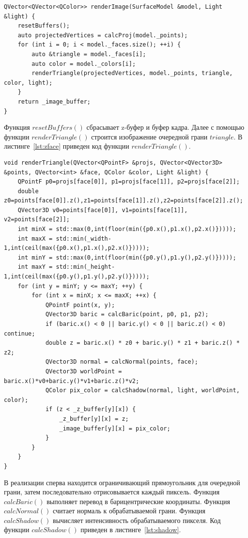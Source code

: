 \documentclass[a4paper, 14pt]{extreport}
\begin{document}
\begin{lstlisting}[style=lang, label=lst:z,caption=Реализация функции renderImage]
QVector<QVector<QColor>> renderImage(SurfaceModel &model, Light &light) {
    resetBuffers();
    auto projectedVertices = calcProj(model._points);
    for (int i = 0; i < model._faces.size(); ++i) {
        auto &triangle = model._faces[i];
        auto color = model._colors[i];
        renderTriangle(projectedVertices, model._points, triangle, color, light);
    }
    return _image_buffer;
}
\end{lstlisting}

Функция $resetBuffers()$ сбрасывает z-буфер и буфер кадра. Далее с помощью функции $renderTriangle()$ строится изображение
очередной грани $triangle$. В листинге~\ref{lst:zface} приведен код функции $renderTriangle()$.

\begin{lstlisting}[style=lang, label=lst:zface,caption=Реализация функции renderTriangle]
void renderTriangle(QVector<QPointF> &projs, QVector<QVector3D> &points, QVector<int> &face, QColor &color, Light &light) {
    QPointF p0=projs[face[0]], p1=projs[face[1]], p2=projs[face[2]];
    double z0=points[face[0]].z(),z1=points[face[1]].z(),z2=points[face[2]].z();
    QVector3D v0=points[face[0]], v1=points[face[1]], v2=points[face[2]];
    int minX = std::max(0,int(floor(min({p0.x(),p1.x(),p2.x()}))));
    int maxX = std::min(_width-1,int(ceil(max({p0.x(),p1.x(),p2.x()}))));
    int minY = std::max(0,int(floor(min({p0.y(),p1.y(),p2.y()}))));
    int maxY = std::min(_height-1,int(ceil(max({p0.y(),p1.y(),p2.y()}))));
    for (int y = minY; y <= maxY; ++y) {
        for (int x = minX; x <= maxX; ++x) {
            QPointF point(x, y);
            QVector3D baric = calcBaric(point, p0, p1, p2);
            if (baric.x() < 0 || baric.y() < 0 || baric.z() < 0) continue;
            double z = baric.x() * z0 + baric.y() * z1 + baric.z() * z2;
            QVector3D normal = calcNormal(points, face);
            QVector3D worldPoint = baric.x()*v0+baric.y()*v1+baric.z()*v2;
            QColor pix_color = calcShadow(normal, light, worldPoint, color);
            if (z < _z_buffer[y][x]) {
                _z_buffer[y][x] = z;
                _image_buffer[y][x] = pix_color;
            }
        }
    }
}
\end{lstlisting}

В реализации сперва находится ограничивающий прямоугольник для очередной грани, затем последовательно отрисовывается
каждый пиксель. Функция $calcBaric()$ выполняет перевод в барицентрические координаты. Функция $calcNormal()$ считает
нормаль к обрабатываемой грани. Функция $calcShadow()$ вычисляет интенсивность обрабатываемого пикселя. Код функции
$calcShadow()$ приведен в листинге~\ref{lst:shadow}.
\end{document}
